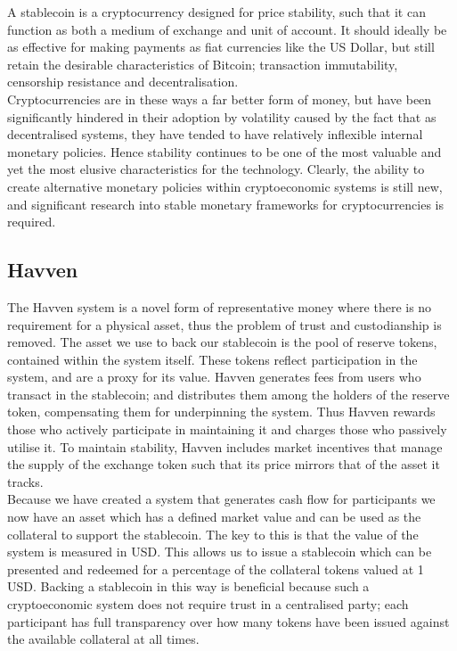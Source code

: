 \noindent A stablecoin is a cryptocurrency designed for price stability, such that it can function as
both a medium of exchange and unit of account. It should ideally be as effective for making payments
as fiat currencies like the US Dollar, but still retain the desirable characteristics of Bitcoin;
transaction immutability, censorship resistance and decentralisation. \\

\noindent Cryptocurrencies are in these ways a far better form of money, but have been significantly hindered
in their adoption by volatility caused by the fact that as decentralised systems, they have tended to have relatively inflexible internal
monetary policies. Hence stability continues to be one of the most valuable and yet the most elusive
characteristics for the technology. Clearly, the ability to create alternative monetary policies within
cryptoeconomic systems is still new, and significant research into stable monetary
frameworks for cryptocurrencies is required.

\subsection{Havven}

\noindent The Havven system is a novel form of representative money where there is no requirement for a physical
asset, thus the problem of trust and custodianship is removed. The asset we use to back our stablecoin is 
the pool of reserve tokens, contained within the system itself. These tokens reflect participation in the system,
and are a proxy for its value. Havven generates fees from users who transact in the stablecoin;
and distributes them among the holders of the reserve token, compensating them for underpinning the system.
Thus Havven rewards those who actively participate in maintaining it and charges those who passively utilise it.
To maintain stability, Havven includes market incentives that manage the supply of the exchange token such that
its price mirrors that of the asset it tracks. \\

\noindent Because we have created a system that generates cash flow for participants we now have an asset which has a defined market
value and can be used as the collateral to support the stablecoin. The key to this is that the value of the
system is measured in USD. This allows us to issue a stablecoin which can be presented and redeemed for a
percentage of the collateral tokens valued at 1 USD. Backing a stablecoin in this way is beneficial because
such a cryptoeconomic system does not require trust in a centralised party; each participant has full
transparency over how many tokens have been issued against the available collateral at all times. \\

